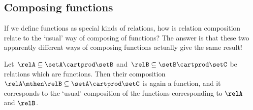 \subsection{Composing functions}

If we define functions as special kinds of relations, how is relation composition relate to the `usual' way of composing of functions?
The answer is that these two apparently different ways of composing functions actually give the same result!

\begin{lemma}
    \label{lem:comprelfun}
    Let~$\relA \subseteq \setA \cartprod \setB$ and~$\relB \subseteq \setB \cartprod \setC$ be relations which are functions.
    Then their composition~$\relA \mthen \relB \subseteq \setA \cartprod \setC$ is again a function, and it corresponds to the `usual' composition of the functions corresponding to $\relA$ and $\relB$.
\end{lemma}

